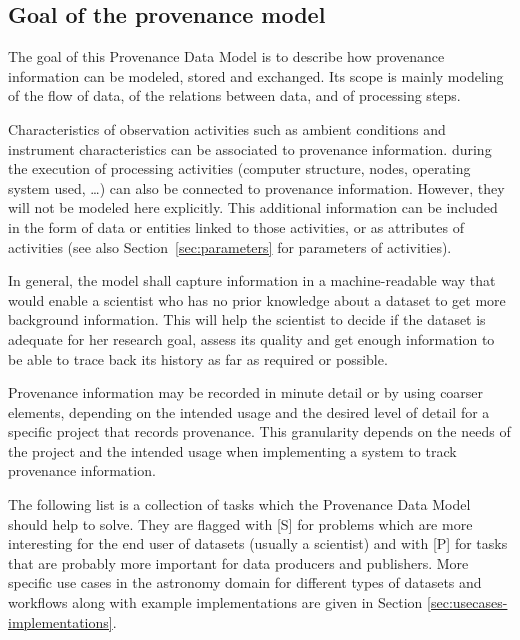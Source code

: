 

\subsection{Goal of the provenance model}\label{sec:goals}

The goal of this Provenance Data Model is to describe how provenance information
can be modeled, stored and exchanged. Its scope
is mainly modeling of the flow of data, of the relations between data,
and of processing steps. 

Characteristics of observation activities such as ambient conditions and
instrument characteristics can be associated to provenance information.  during
the execution of processing activities (computer structure, nodes, operating
system used, \dots) can also be connected to provenance information. However,
they will not be modeled here explicitly. This additional information can be
included in the form of data or entities linked to those activities, or as
attributes of activities (see also Section~\ref{sec:parameters} for parameters
of activities).

In general, the model shall capture information in a machine-readable way that would enable a scientist who has no prior knowledge about a dataset to get more background information. 
This will help the scientist to decide if the dataset 
is adequate for her research goal, assess its quality and get enough information
to be able to trace back its history as far as required or possible. 

Provenance information may be recorded in minute detail or by using coarser
elements, depending on the intended usage and the desired level of detail
for a specific project that records provenance. 
This granularity depends on the needs of the project and the intended usage when implementing a system to track provenance information.

The following list is a collection of tasks which the Provenance Data Model should help to solve. They are flagged with [S] for problems which are more interesting for the end user of datasets (usually a scientist) and with [P] for tasks that are probably more important for data producers and publishers.
More specific use cases in the astronomy domain for different types of datasets and workflows along with example implementations are given in Section \ref{sec:usecases-implementations}.



